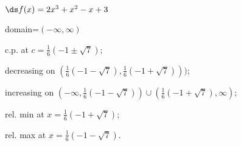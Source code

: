 {$\ds f(x) =2 x^3+x^2-x+3$
}
{domain=$(-\infty,\infty)$

c.p. at $c=\frac16(-1\pm\sqrt{7})$; 

decreasing on $(\frac16(-1-\sqrt{7}),\frac16(-1+\sqrt{7})))$;

increasing on $(-\infty,\frac16(-1-\sqrt{7})) \cup (\frac16(-1+\sqrt{7}),\infty)$;

rel. min at $x=\frac16(-1+\sqrt{7})$;

rel. max at $x=\frac16(-1-\sqrt{7})$.
}
